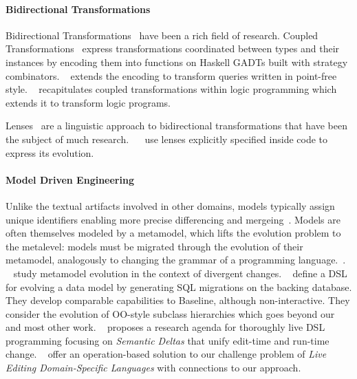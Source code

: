 \documentclass[english,submission]{programming}
\theoremstyle{definition}
\newcommand{\citet}[1]{\citeauthor*{#1}~\cite{#1}}
\begin{document}
\paragraph{Bidirectional Transformations}
 Bidirectional Transformations~\cite{czarnecki2009bidirectional, hu2024bidirectional} have been a rich field of research.
Coupled Transformations~\cite{Berdaguer07, alcino06, Cleve2006} express transformations coordinated between types and their instances by encoding them into functions on Haskell GADTs built with strategy combinators. \citet{JVisser08} extends the encoding to transform queries written in point-free style. \citet{lammel16} recapitulates coupled transformations within logic programming which extends it to transform logic programs.

Lenses~\cite{Foster2007,edit-lenses} are a linguistic approach to bidirectional transformations that have been the subject of much research.
 ~\citet{carvalho24} use lenses explicitly specified inside code to express its evolution.

\paragraph{Model Driven Engineering}
Unlike the textual artifacts involved in other domains, models typically assign unique identifiers enabling more precise differencing and mergeing~\cite{alanen2003}.
Models are often themselves modeled by a metamodel, which lifts the evolution problem to the metalevel: models must be migrated through the evolution of their metamodel, analogously to changing the grammar of a programming language.~\cite{Herrmannsdoerfer11}. \citet{Cicchetti11} study metamodel evolution in the context of divergent changes.
\citet{vermolen11} define a DSL for evolving a data model by generating SQL migrations on the backing database. They develop comparable capabilities to Baseline, although non-interactive. They consider the evolution of OO-style subclass hierarchies which goes beyond our and most other work.
\citet{SemanticDeltas} proposes a research agenda for thoroughly live DSL programming focusing on \emph{Semantic Deltas} that unify edit-time and run-time change.
\citet{exelmans25} offer an operation-based solution to our challenge problem of \textit{Live Editing Domain-Specific Languages} with connections to our approach.
\end{document}
